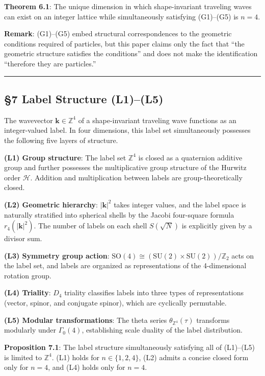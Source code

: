 \documentclass[
  a4paper,11pt]{article}
\theoremstyle{definition}
\theoremstyle{remark}
\begin{document}
\textbf{Theorem 6.1}: The unique dimension in which shape-invariant
traveling waves can exist on an integer lattice while simultaneously
satisfying (G1)--(G5) is \(n = 4\).

\textbf{Remark}: (G1)--(G5) embed structural correspondences to the
geometric conditions required of particles, but this paper claims only
the fact that ``the geometric structure satisfies the conditions'' and
does not make the identification ``therefore they are particles.''

\begin{center}\rule{0.5\linewidth}{0.5pt}\end{center}

\subsection{§7 Label Structure (L1)--(L5)}\label{label-structure-l1l5}

The wavevector \(\mathbf{k} \in \mathbb{Z}^4\) of a shape-invariant
traveling wave functions as an integer-valued label. In four dimensions,
this label set simultaneously possesses the following five layers of
structure.

\textbf{(L1) Group structure}: The label set \(\mathbb{Z}^4\) is closed
as a quaternion additive group and further possesses the multiplicative
group structure of the Hurwitz order \(\mathcal{H}\). Addition and
multiplication between labels are group-theoretically closed.

\textbf{(L2) Geometric hierarchy}: \(|\mathbf{k}|^2\) takes integer
values, and the label space is naturally stratified into spherical
shells by the Jacobi four-square formula \(r_4(|\mathbf{k}|^2)\). The
number of labels on each shell \(S(\sqrt{N})\) is explicitly given by a
divisor sum.

\textbf{(L3) Symmetry group action}:
\(\mathrm{SO}(4) \cong (\mathrm{SU}(2) \times \mathrm{SU}(2))/\mathbb{Z}_2\)
acts on the label set, and labels are organized as representations of
the 4-dimensional rotation group.

\textbf{(L4) Triality}: \(D_4\) triality classifies labels into three
types of representations (vector, spinor, and conjugate spinor), which
are cyclically permutable.

\textbf{(L5) Modular transformations}: The theta series
\(\theta_{\mathbb{Z}^4}(\tau)\) transforms modularly under
\(\Gamma_0(4)\), establishing scale duality of the label distribution.

\textbf{Proposition 7.1}: The label structure simultaneously satisfying
all of (L1)--(L5) is limited to \(\mathbb{Z}^4\). (L1) holds for
\(n \in \{1, 2, 4\}\), (L2) admits a concise closed form only for
\(n = 4\), and (L4) holds only for \(n = 4\).
\end{document}

